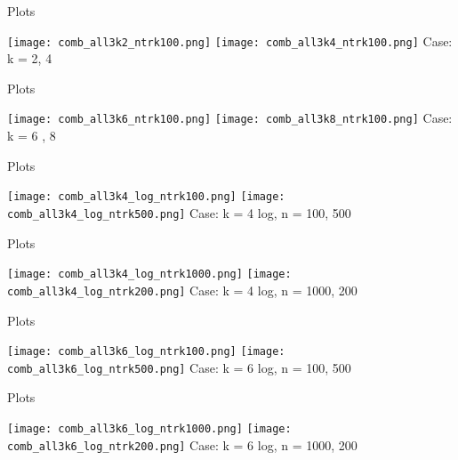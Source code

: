 \documentclass[aspectratio=169,compress,10pt]{beamer} %
\begin{document}
\begin{frame}{Plots}
\begin{adjustwidth}{-2em}{-2em}
\texttt{[image: comb\_all3k2\_ntrk100.png]}
\texttt{[image: comb\_all3k4\_ntrk100.png]}
Case: k = 2, 4
\end{adjustwidth}
\end{frame}

\begin{frame}{Plots}
\begin{adjustwidth}{-2em}{-2em}
\texttt{[image: comb\_all3k6\_ntrk100.png]}
\texttt{[image: comb\_all3k8\_ntrk100.png]}
Case: k = 6 , 8
\end{adjustwidth}
\end{frame}

\begin{frame}{Plots}
\begin{adjustwidth}{-2em}{-2em}
\texttt{[image: comb\_all3k4\_log\_ntrk100.png]}
\texttt{[image: comb\_all3k4\_log\_ntrk500.png]}
Case: k = 4 log, n = 100, 500
\end{adjustwidth}
\end{frame}

\begin{frame}{Plots}
\begin{adjustwidth}{-2em}{-2em}
\texttt{[image: comb\_all3k4\_log\_ntrk1000.png]}
\texttt{[image: comb\_all3k4\_log\_ntrk200.png]}
Case: k = 4 log, n = 1000, 200
\end{adjustwidth}
\end{frame}

\begin{frame}{Plots}
\begin{adjustwidth}{-2em}{-2em}
\texttt{[image: comb\_all3k6\_log\_ntrk100.png]}
\texttt{[image: comb\_all3k6\_log\_ntrk500.png]}
Case: k = 6 log, n = 100, 500
\end{adjustwidth}
\end{frame}

\begin{frame}{Plots}
\begin{adjustwidth}{-2em}{-2em}
\texttt{[image: comb\_all3k6\_log\_ntrk1000.png]}
\texttt{[image: comb\_all3k6\_log\_ntrk200.png]}
Case: k = 6 log, n = 1000, 200
\end{adjustwidth}
\end{frame}
\end{document}
